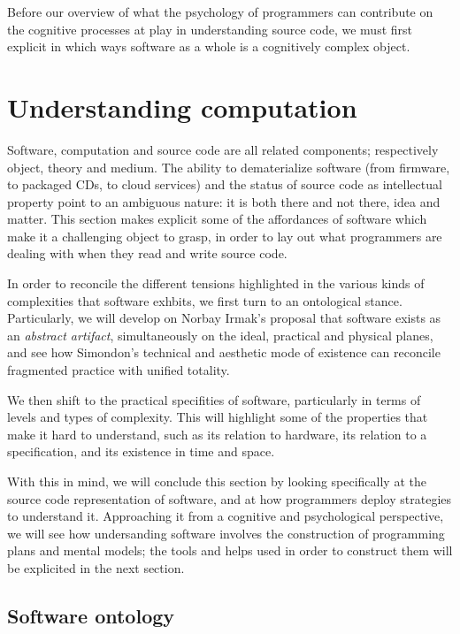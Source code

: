 Before our overview of what the psychology of programmers can contribute on the cognitive processes at play in understanding source code, we must first explicit in which ways software as a whole is a cognitively complex object.

\spacer

\section{Understanding computation}
\label{sec:understanding-computation}

Software, computation and source code are all related components; respectively object, theory and medium. The ability to dematerialize software (from firmware, to packaged CDs, to cloud services) and the status of source code as intellectual property point to an ambiguous nature: it is both there and not there, idea and matter. This section makes explicit some of the affordances of software which make it a challenging object to grasp, in order to lay out what programmers are dealing with when they read and write source code.

In order to reconcile the different tensions highlighted in the various kinds of complexities that software exhbits, we first turn to an ontological stance. Particularly, we will develop on Norbay Irmak's proposal that software exists as an \emph{abstract artifact}, simultaneously on the ideal, practical and physical planes, and see how Simondon's technical and aesthetic mode of existence can reconcile fragmented practice with unified totality.

We then shift to the practical specifities of software, particularly in terms of levels and types of complexity. This will highlight some of the properties that make it hard to understand, such as its relation to hardware, its relation to a specification, and its existence in time and space.

With this in mind, we will conclude this section by looking specifically at the source code representation of software, and at how programmers deploy strategies to understand it. Approaching it from a cognitive and psychological perspective, we will see how undersanding software involves the construction of programming plans and mental models; the tools and helps used in order to construct them will be explicited in the next section.

\subsection{Software ontology}
\label{subsec:software-ontology}

